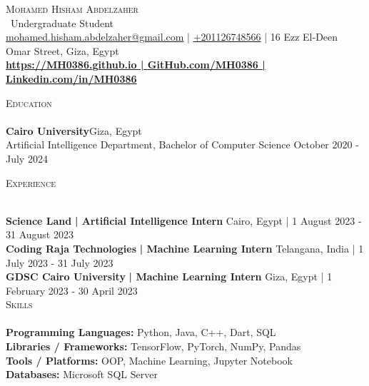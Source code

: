 \documentclass[a4paper]{article}
\newcommand{\lineunder} {
    \vspace*{-8pt} \\
    \hspace*{-18pt} \hrulefill \\
}
\newcommand{\header} [1] {
    {\hspace*{-18pt}\vspace*{6pt} \textsc{#1}}
    \vspace*{-6pt} \lineunder
}
\begin{document}
    \vspace*{-40pt}

    

%
%
  \vspace*{-2pt}
  \begin{center}
    {\Huge \scshape {Mohamed Hisham Abdelzaher}}\\
    \vspace*{2pt}
    \ {Undergraduate Student}\\
    \vspace*{2pt}
    \href{mailto:mohamed.hisham.abdelzaher@gmail.com}{mohamed.hisham.abdelzaher@gmail.com} | \href{tel:+201126748566}{+201126748566} | 16 Ezz El-Deen Omar Street, Giza, Egypt\\
    \vspace*{2pt}
    \textbf{\href{https://mh0386.github.io}{https://MH0386.github.io | }}\textbf{\href{https://github.com/MH0386}{GitHub.com/MH0386 | }}\textbf{\href{https://linkedin.com/in/MH0386}{Linkedin.com/in/MH0386}}\\
  \end{center}



      \header{Education}
      \vspace{2mm}
      \textbf{Cairo University}\hfill Giza, Egypt\\
Artificial Intelligence Department, Bachelor of Computer Science \hfill October 2020 - July 2024\\
\vspace{2mm}

%
%
  \header{Experience}
  \vspace{2mm}

  \textbf{Science Land}\textbf{ | Artificial Intelligence Intern} \hfill Cairo, Egypt | 1 August 2023 - 31 August 2023\\
  \textbf{Coding Raja Technologies}\textbf{ | Machine Learning Intern} \hfill Telangana, India | 1 July 2023 - 31 July 2023\\
  \textbf{GDSC Cairo University}\textbf{ | Machine Learning Intern} \hfill Giza, Egypt | 1 February 2023 - 30 April 2023\\

%
%
  \header{Skills}
  \vspace{2mm}
  \textbf{Programming Languages:} Python, Java, C++, Dart, SQL \\
  \textbf{Libraries / Frameworks:} TensorFlow, PyTorch, NumPy, Pandas \\
  \textbf{Tools / Platforms:} OOP, Machine Learning, Jupyter Notebook \\
  \textbf{Databases:} Microsoft SQL Server \\
  \vspace{2mm}
\end{document}
